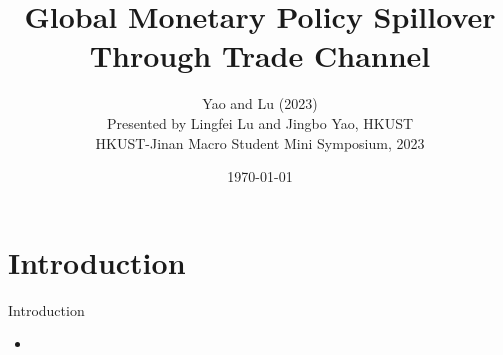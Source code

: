 \documentclass[10pt]{beamer}
\title[Global Monetary Policy Spillover Through Trade Channel]{Global Monetary Policy Spillover Through Trade Channel}
\author[Yao\&Lu (2023)]{\large Yao and Lu (2023) \\ \vspace{0.5cm} Presented by Lingfei Lu and Jingbo Yao, HKUST \\ \vspace{0.5cm} HKUST-Jinan Macro Student Mini Symposium, 2023}
\date{\today}
\begin{document}
	
	\begin{frame}[plain]
		\maketitle {}
	\end{frame}


\section{Introduction}

\begin{frame}{Introduction}
	\begin{itemize}
		\item 
	\end{itemize}
\end{frame}
\end{document}
